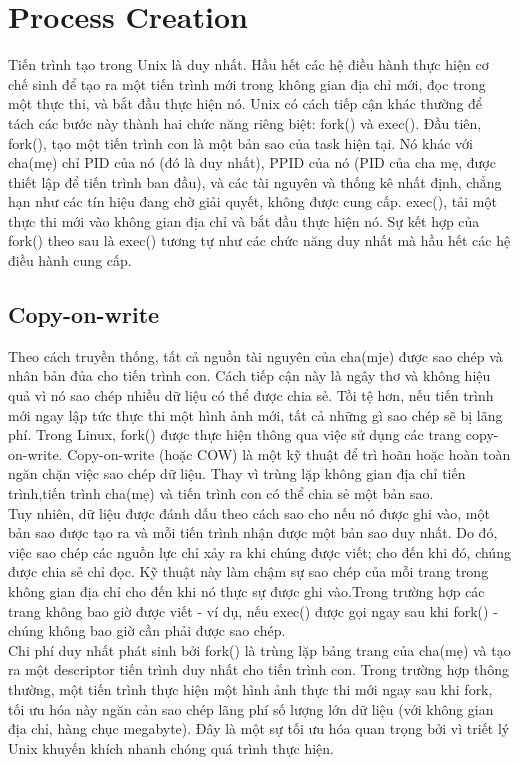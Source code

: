 \documentclass[a4paper,10pt]{report}
\begin{document}
\section{Process Creation}
Tiến trình tạo trong Unix là duy nhất. Hầu hết các hệ điều hành thực hiện cơ chế sinh để tạo ra một tiến trình mới trong không gian địa chỉ mới, đọc trong một thực thi, và bắt đầu thực hiện nó. Unix có cách tiếp cận khác thường để tách các bước này thành hai chức năng riêng biệt: fork() và exec(). Đầu tiên, fork(), tạo một tiến trình con là một bản sao của task hiện tại. Nó khác với cha(mẹ) chỉ PID của nó (đó là duy nhất), PPID của nó (PID của cha mẹ, được thiết lập để tiến trình ban đầu), và các tài nguyên và thống kê nhất định, chẳng hạn như các tín hiệu đang chờ giải quyết, không được cung cấp. exec(), tải một thực thi mới vào không gian địa chỉ và bắt đầu thực hiện nó. Sự kết hợp của fork() theo sau là exec() tương tự như các chức năng duy nhất mà hầu hết các hệ điều hành cung cấp. \\
\subsection{Copy-on-write}
Theo cách truyền thống, tất cả nguồn tài nguyên của cha(mje) được sao chép và nhân bản đủa cho tiến trình con. Cách tiếp cận này là ngây thơ và không hiệu quả vì nó sao chép nhiều dữ liệu có thể được chia sẻ. Tồi tệ hơn, nếu tiến trình mới ngay lập tức thực thi một hình ảnh mới, tất cả những gì sao chép sẽ bị lãng phí. Trong Linux, fork() được thực hiện thông qua việc sử dụng các trang copy-on-write. Copy-on-write (hoặc COW) là một kỹ thuật để trì hoãn hoặc hoàn toàn ngăn chặn việc sao chép dữ liệu. Thay vì trùng lặp không gian địa chỉ tiến trình,tiến trình cha(mẹ) và tiến trình con có thể chia sẻ một bản sao. \\

Tuy nhiên, dữ liệu được đánh dấu theo cách sao cho nếu nó được ghi vào, một bản sao được tạo ra và mỗi tiến trình nhận được một bản sao duy nhất.  Do đó, việc sao chép các nguồn lực chỉ xảy ra khi chúng được viết; cho đến khi đó, chúng được chia sẻ chỉ đọc. Kỹ thuật này làm chậm sự sao chép của mỗi trang trong không gian địa chỉ cho đến khi nó thực sự được ghi vào.Trong trường hợp các trang không bao giờ được viết - ví dụ, nếu exec() được gọi ngay sau khi fork() - chúng không bao giờ cần phải được sao chép. \\

Chi phí duy nhất phát sinh bởi fork() là trùng lặp bảng trang của cha(mẹ) và tạo ra một descriptor tiến trình duy nhất cho tiến trình con. Trong trường hợp thông thường, một tiến trình thực hiện một hình ảnh thực thi mới ngay sau khi fork, tối ưu hóa này ngăn cản sao chép lãng phí số lượng lớn dữ liệu (với không gian địa chỉ, hàng chục megabyte). Đây là một sự tối ưu hóa quan trọng bởi vì triết lý Unix khuyến khích nhanh chóng quá trình thực hiện. \\
\end{document}
